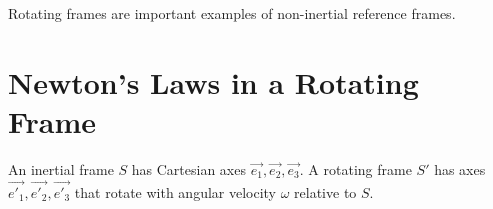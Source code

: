 \documentclass[../Main.tex]{subfiles}
\begin{document}
Rotating frames are important examples of non-inertial reference frames.
\section{Newton's Laws in a Rotating Frame}
An inertial frame $S$ has Cartesian axes $\vec{e_1}, \vec{e_2}, \vec{e_3}$. A rotating frame $S'$ has axes $\vec{e'_1}, \vec{e'_2}, \vec{e'_3}$ that rotate with angular velocity $\omega$ relative to $S$.
\end{document}
